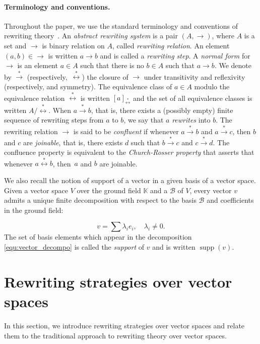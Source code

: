 \documentclass[11pt]{article}
\theoremstyle{definition}
\newcommand\basis{\mathscr{B}}
\DeclareMathOperator{\supp}{supp}
\newcommand\K{\mathbb{K}}
\newcommand\transRew{\overset{*}{\to}}
\newcommand\rewEquiv{\overset{*}{\leftrightarrow}}
\begin{document}
\paragraph{Terminology and conventions.}

Throughout the paper, we use the standard terminology and conventions of
rewriting theory~\cite{MR1629216}. An {\em abstract rewriting system} is
a pair $(A,\to)$, where $A$ is a set and $\to$ is binary relation on $A$,
called {\em rewriting relation}. An element~$(a,b)\in\to$ is written
$a\to b$ and is called a {\em rewriting step}. A {\em normal form} for
$\to$ is an element $a\in A$ such that there is no $b\in A$ such that
$a\to b$. We denote by $\transRew$  (respectively,~$\rewEquiv$) the
closure of $\to$ under transitivity and reflexivity (respectively, and
symmetry). The equivalence class of $a\in A$ modulo the equivalence
relation $\rewEquiv$ is written $[a]_{\rewEquiv}$ and the set of all
equivalence classes is written $A/\rewEquiv$. When $a\transRew b$, that
is, there exists a (possibly empty) finite sequence of rewriting steps
from $a$ to  $b$, we say that $a$ {\em rewrites} into $b$. The rewriting
relation $\to$ is said to be {\em confluent} if whenever $a\transRew b$
and $a\transRew c$, then $b$ and $c$ are {\em joinable}, that is, there
exists $d$ such that $b\transRew c$ and $c\transRew d$. The confluence
property is equivalent to the {\em Church-Rosser property} that asserts
that whenever $a\rewEquiv b$, then~$a$ and $b$ are joinable.
\medskip

We also recall the notion of support of a vector in a given basis of a
vector space. Given a vector space $V$ over the ground field $\K$ and a
$\basis$ of $V$, every vector $v$ admits a unique finite decomposition
with respect to the basis $\basis$ and coefficients in the ground field:

\begin{equation}\label{equ:vector_decompo}
  v=\sum\lambda_ie_i,\quad\lambda_i\neq 0.
\end{equation}
The set of basis elements which appear in the decomposition
\eqref{equ:vector_decompo} is called the {\it support} of $v$ and is
written $\supp(v)$. 


\section{Rewriting strategies over vector spaces}
\label{sec:rewriting_strategies_over_vector_space}

In this section, we introduce rewriting strategies over vector spaces and
relate them to the traditional approach to rewriting theory over vector
spaces. 
\medskip
\end{document}

